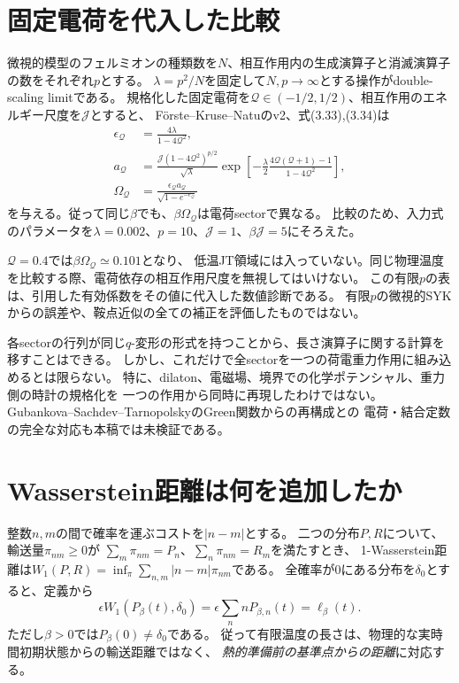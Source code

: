 \documentclass[a4paper,11pt]{ltjsarticle}
\numberwithin{equation}{section}
\begin{document}
\section{固定電荷を代入した比較}
微視的模型のフェルミオンの種類数を$N$、相互作用内の生成演算子と消滅演算子の数をそれぞれ$p$とする。
$\lambda=p^2/N$を固定して$N,p\to\infty$とする操作がdouble-scaling limitである。
規格化した固定電荷を$\mathcal Q\in(-1/2,1/2)$、相互作用のエネルギー尺度を$\mathcal J$とすると、
F\"orste--Kruse--Natuのv2、式(3.33),(3.34)は\cite{Forste}
\begin{align}
 \epsilon_{\mathcal Q}&=\frac{4\lambda}{1-4\mathcal Q^2},\\
 a_{\mathcal Q}&=\frac{\mathcal J(1-4\mathcal Q^2)^{p/2}}{\sqrt\lambda}
 \exp\left[-\frac{\lambda}{2}
 \frac{4\mathcal Q(\mathcal Q+1)-1}{1-4\mathcal Q^2}\right],\\
 \Omega_{\mathcal Q}&=\frac{\epsilon_{\mathcal Q}a_{\mathcal Q}}
 {\sqrt{1-e^{-\epsilon_{\mathcal Q}}}}
 \label{eq:charge}
\end{align}
を与える。従って同じ$\beta$でも、$\beta\Omega_{\mathcal Q}$は電荷sectorで異なる。
比較のため、入力式のパラメータを$\lambda=0.002$、$p=10$、$\mathcal J=1$、$\beta\mathcal J=5$にそろえた。
\begin{table}[htbp]
\centering\small

\caption{同じ微視的温度、異なる固定電荷での補助Hamiltonianの計算。
時間をsectorごとにフィットして合わせた表ではない。}
\label{tab:charge}
\end{table}
$\mathcal Q=0.4$では$\beta\Omega_{\mathcal Q}\simeq0.101$となり、
低温JT領域には入っていない。同じ物理温度を比較する際、電荷依存の相互作用尺度を無視してはいけない。
この有限$p$の表は、引用した有効係数をその値に代入した数値診断である。
有限$p$の微視的SYKからの誤差や、鞍点近似の全ての補正を評価したものではない。

各sectorの行列が同じ$q$-変形の形式を持つことから、長さ演算子に関する計算を移すことはできる。
しかし、これだけで全sectorを一つの荷電重力作用に組み込めるとは限らない。
特に、dilaton、電磁場、境界での化学ポテンシャル、重力側の時計の規格化を
一つの作用から同時に再現したわけではない。
Gubankova--Sachdev--TarnopolskyのGreen関数からの再構成\cite{Gubankova}との
電荷・結合定数の完全な対応も本稿では未検証である。

\section{Wasserstein距離は何を追加したか}
整数$n,m$の間で確率を運ぶコストを$|n-m|$とする。
二つの分布$P,R$について、輸送量$\pi_{nm}\geq0$が
$\sum_m\pi_{nm}=P_n$、$\sum_n\pi_{nm}=R_m$を満たすとき、
1-Wasserstein距離は$W_1(P,R)=\inf_\pi\sum_{n,m}|n-m|\pi_{nm}$である。
全確率が$0$にある分布を$\delta_0$とすると、定義から
\begin{equation}
 \epsilon W_1(P_\beta(t),\delta_0)=\epsilon\sum_n nP_{\beta,n}(t)=\ell_\beta(t).
 \label{eq:wtolength}
\end{equation}
ただし$\beta>0$では$P_\beta(0)\ne\delta_0$である。
従って有限温度の長さは、物理的な実時間初期状態からの輸送距離ではなく、
\emph{熱的準備前の基準点からの距離}に対応する。
\end{document}
